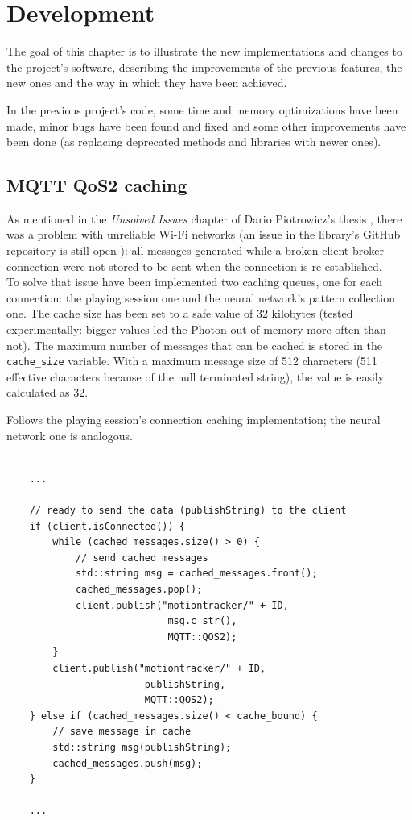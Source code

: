 \chapter{Development}
The goal of this chapter is to illustrate the new implementations and changes to the project's software, describing the improvements of the previous features, the new ones and the way in which they have been achieved.
\bigbreak

In the previous project's code, some time and memory optimizations have been made, minor bugs have been found and fixed and some other improvements have been done (as replacing deprecated methods and libraries with newer ones).

\section{MQTT QoS2 caching}
As mentioned in the \textit{Unsolved Issues} chapter of Dario Piotrowicz's thesis \cite{Pio19}, there was a problem with unreliable Wi-Fi networks (an issue in the library's GitHub repository is still open \cite{githubQos2Issue}): all messages generated while a broken client-broker connection were not stored to be sent when the connection is re-established.\\
To solve that issue have been implemented two caching queues, one for each connection: the playing session one and the neural network's pattern collection one. The cache size has been set to a safe value of 32 kilobytes (tested experimentally: bigger values led the Photon out of memory more often than not).
The maximum number of messages that can be cached is stored in the \texttt{cache\_size} variable. With a maximum message size of 512 characters (511 effective characters because of the null terminated string), the value is easily calculated as 32.

Follows the playing session's connection caching implementation; the neural network one is analogous.
\bigbreak

\begin{lstlisting}[style=CPPStyle]

	...

	// ready to send the data (publishString) to the client
	if (client.isConnected()) {
        while (cached_messages.size() > 0) {
			// send cached messages
            std::string msg = cached_messages.front();
            cached_messages.pop();
			client.publish("motiontracker/" + ID,
							msg.c_str(),
							MQTT::QOS2);
        }
		client.publish("motiontracker/" + ID,
						publishString,
						MQTT::QOS2);
    } else if (cached_messages.size() < cache_bound) {
		// save message in cache
        std::string msg(publishString);
        cached_messages.push(msg);
    }

	...

\end{lstlisting}
\bigbreak


